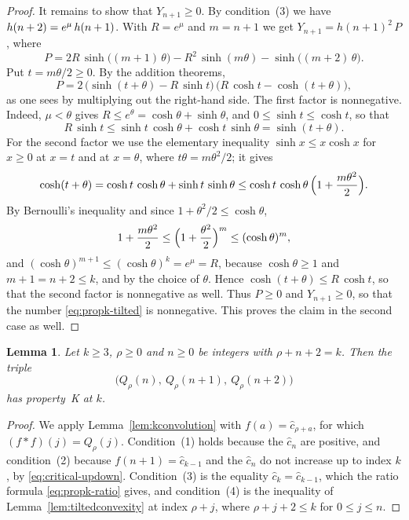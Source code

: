 \documentclass{amsart}
\makeatletter
\newtheorem{lemma}[theorem]{Lemma}
\theoremstyle{definition}
\theoremstyle{remark}
\numberwithin{equation}{section}
\def\subsection{\@startsection{subsection}{2}\z@{.5\linespacing\@plus.7\linespacing}{-.5em}{\normalfont\bfseries\boldmath}}
\makeatother
\begin{document}
\begin{proof}
It remains to show that $Y_{n+1}\ge 0$. By condition~(3) we have $h(n+\nobreak 2)=e^{\mu}\,h(n+\nobreak 1)$. With $R=e^{\mu}$ and $m=n+1$ we get $Y_{n+1}=h(n+1)^2\,P$, where
\[
P=2R\,\sinh\bigl((m+1)\,\theta\bigr)-R^2\,\sinh(m\theta)-\sinh\bigl((m+2)\,\theta\bigr).
\]
Put $t=m\theta/2\ge 0$. By the addition theorems,
\[
P=2\,\bigl(\sinh(t+\theta)-R\,\sinh t\bigr)\,\bigl(R\,\cosh t-\cosh(t+\theta)\bigr),
\]
as one sees by multiplying out the right-hand side. The first factor is nonnegative. Indeed, $\mu<\theta$ gives $R\le e^{\theta}=\cosh\theta+\sinh\theta$, and $0\le\sinh t\le\cosh t$, so that
\[
R\,\sinh t\le\sinh t\,\cosh\theta+\cosh t\,\sinh\theta=\sinh(t+\theta).
\]
For the second factor we use the elementary inequality $\sinh x\le x\cosh x$ for $x\ge 0$ at $x=t$ and at $x=\theta$, where $t\theta=m\theta^2/2$; it gives
\[
\cosh(t+\theta)=\cosh t\,\cosh\theta+\sinh t\,\sinh\theta\le\cosh t\,\cosh\theta\,\Bigl(1+\frac{m\theta^2}{2}\Bigr).
\]
By Bernoulli's inequality and since $1+\theta^2/2\le\cosh\theta$,
\[
1+\frac{m\theta^2}{2}\le\Bigl(1+\frac{\theta^2}{2}\Bigr)^{m}\le(\cosh\theta)^{m},
\]
and $(\cosh\theta)^{m+1}\le(\cosh\theta)^{k}=e^{\mu}=R$, because $\cosh\theta\ge 1$ and $m+1=n+2\le k$, and by the choice of $\theta$. Hence $\cosh(t+\theta)\le R\,\cosh t$, so that the second factor is nonnegative as well. Thus $P\ge 0$ and $Y_{n+1}\ge 0$, so that the number \eqref{eq:propk-tilted} is nonnegative. This proves the claim in the second case as well.
\end{proof}

\begin{lemma}\label{lem:kpairsums}
Let $k\ge 3$, $\rho\ge 0$ and $n\ge 0$ be integers with $\rho+n+2=k$. Then the triple
\[
\bigl(Q_\rho(n),\ Q_\rho(n+1),\ Q_\rho(n+2)\bigr)
\]
has property~K at $k$.
\end{lemma}

\begin{proof}
We apply Lemma~\ref{lem:kconvolution} with $f(a)=\hat c_{\rho+a}$, for which $(f*f)(j)=Q_\rho(j)$. Condition~(1) holds because the $\hat c_n$ are positive, and condition~(2) because $f(n+1)=\hat c_{k-1}$ and the $\hat c_n$ do not increase up to index $k$, by \eqref{eq:critical-updown}. Condition~(3) is the equality $\hat c_k=\hat c_{k-1}$, which the ratio formula \eqref{eq:propk-ratio} gives, and condition~(4) is the inequality of Lemma~\ref{lem:tiltedconvexity} at index $\rho+j$, where $\rho+j+2\le k$ for $0\le j\le n$.
\end{proof}

\subsection{The direct term}\label{subsec:propk-direct}
\end{document}
